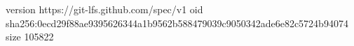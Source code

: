 version https://git-lfs.github.com/spec/v1
oid sha256:0ecd29f88ae9395626344a1b9562b588479039c9050342ade6e82c5724b94074
size 105822
